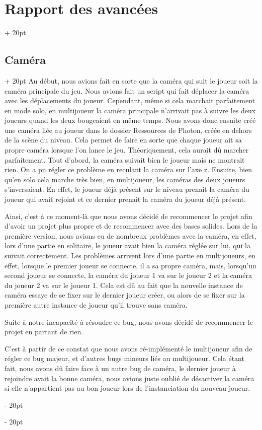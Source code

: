 \documentclass[a4paper, 12pt, twoside]{article}
\newcommand{\ind}[1][20pt]{\advance\leftskip + #1}
\newcommand{\deind}[1][20pt]{\advance\leftskip - #1}
\newenvironment{indt}[2][20pt]{#2 \par \ind[#1]}{\par \deind} %
\begin{document}
\begin{indt}{\section{Rapport des avancées}}
\begin{indt}{\subsection{Caméra}}
            Au début, nous avions fait en sorte que la caméra qui suit le joueur soit la caméra principale du jeu. Nous avions fait un script qui fait déplacer la caméra avec les déplacements du joueur. Cependant, même si cela marchait parfaitement en mode solo, en multijoueur la caméra principale n'arrivait pas à suivre les deux joueurs quand les deux bougeaient en même temps. Nous avons donc ensuite créé une caméra liée au joueur dans le dossier Ressources de Photon, créée en dehors de la scène du niveau. Cela permet de faire en sorte que chaque joueur ait sa propre caméra lorsque l'on lance le jeu. Théoriquement, cela aurait dû marcher parfaitement. Tout d'abord, la caméra suivait bien le joueur mais ne montrait rien. On a pu régler ce problème en reculant la caméra sur l'axe z. Ensuite, bien qu'en solo cela marche très bien, en multijoueur, les caméras des deux joueurs s'inversaient. En effet, le joueur déjà présent sur le niveau prenait la caméra du joueur qui avait rejoint et ce dernier prenait la caméra du joueur déjà présent.

            Ainsi, c'est à ce moment-là que nous avons décidé de recommencer le projet afin d'avoir un projet plus propre et de recommencer avec des bases solides. Lors de la première version, nous avions eu de nombreux problèmes avec la caméra, en effet, lors d'une partie en solitaire, le joueur avait bien la caméra réglée sur lui, qui la suivait correctement. Les problèmes arrivent lors d'une partie en multijoueurs, en effet, lorsque le premier joueur se connecte, il a sa propre caméra, mais, lorsqu'un second joueur se connecte, la caméra du joueur 1 va sur le joueur 2 et la caméra du joueur 2 va sur le joueur 1. Cela est dû au fait que la nouvelle instance de caméra essaye de se fixer sur le dernier joueur créer, ou alors de se fixer sur la première autre instance de joueur qu'il trouve sans caméra.

            Suite à notre incapacité à résoudre ce bug, nous avons décidé de recommencer le projet en partant de rien.

            C'est à partir de ce constat que nous avons ré-implémenté le multijoueur afin de régler ce bug majeur, et d'autres bugs mineurs liés au multijoueur. Cela étant fait, nous avons dû faire face à un autre bug de caméra, le dernier joueur à rejoindre avait la bonne caméra, nous avions juste oublié de désactiver la caméra si elle n'appartient pas au bon joueur lors de l'instanciation du nouveau joueur.

        \end{indt}


\end{indt}
\end{document}
